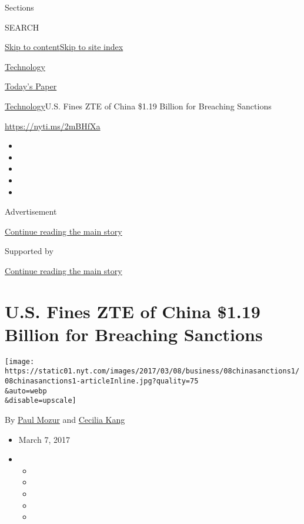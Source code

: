 Sections

SEARCH

\protect\hyperlink{site-content}{Skip to
content}\protect\hyperlink{site-index}{Skip to site index}

\href{https://www.nytimes.com/section/technology}{Technology}

\href{https://myaccount.nytimes.com/auth/login?response_type=cookie\&client_id=vi}{}

\href{https://www.nytimes.com/section/todayspaper}{Today's Paper}

\href{/section/technology}{Technology}\textbar{}U.S. Fines ZTE of China
\$1.19 Billion for Breaching Sanctions

\url{https://nyti.ms/2mBHfXa}

\begin{itemize}
\item
\item
\item
\item
\item
\end{itemize}

Advertisement

\protect\hyperlink{after-top}{Continue reading the main story}

Supported by

\protect\hyperlink{after-sponsor}{Continue reading the main story}

\hypertarget{us-fines-zte-of-china-119-billion-for-breaching-sanctions}{%
\section{U.S. Fines ZTE of China \$1.19 Billion for Breaching
Sanctions}\label{us-fines-zte-of-china-119-billion-for-breaching-sanctions}}

\texttt{[image: https://static01.nyt.com/images/2017/03/08/business/08chinasanctions1/08chinasanctions1-articleInline.jpg?quality=75\\\&auto=webp\\\&disable=upscale]}

By \href{https://www.nytimes.com/by/paul-mozur}{Paul Mozur} and
\href{http://www.nytimes.com/by/cecilia-kang}{Cecilia Kang}

\begin{itemize}
\item
  March 7, 2017
\item
  \begin{itemize}
  \item
  \item
  \item
  \item
  \item
  \end{itemize}
\end{itemize}

